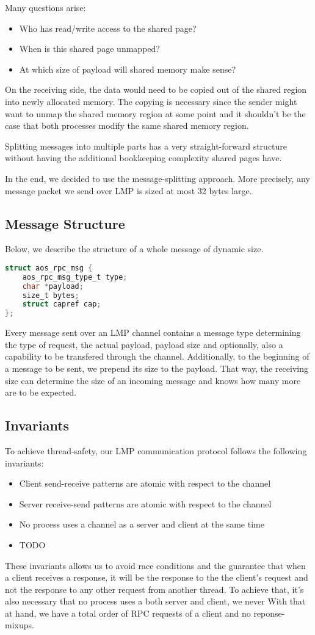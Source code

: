 Many questions arise:
\begin{itemize}
    \item Who has read/write access to the shared page? 
    \item When is this shared page unmapped?
    \item At which size of payload will shared memory make sense?
\end{itemize}
On the receiving side, the data would need to be copied out of the shared region 
into newly allocated memory. The copying is necessary since the sender 
might want to unmap the shared memory region at some point and it shouldn't be 
the case that both processes modify the same shared memory region.

Splitting messages into multiple parts has a very straight-forward structure 
without having the additional bookkeeping complexity shared pages have.


In the end, we decided to use the message-splitting approach.
More precisely, any message packet we send over LMP is sized at most 32 bytes
large.  

\subsection{Message Structure}
Below, we describe the structure of a whole message of dynamic size.
\begin{lstlisting}[language=C]
struct aos_rpc_msg {
    aos_rpc_msg_type_t type;
    char *payload;
    size_t bytes;
    struct capref cap;
};
\end{lstlisting}
Every message sent over an LMP channel contains a message type determining 
the type of request, the actual payload, payload size and optionally, 
also a capability to be transfered through the channel. 
Additionally, to the beginning of a message to be sent, we prepend its size 
to the payload. That way, the receiving size can determine the size of an 
incoming message and knows how many more are to be expected.

\subsection{Invariants}
To achieve thread-safety, our LMP communication protocol 
follows the following invariants:
\begin{itemize}
    \item Client send-receive patterns are atomic with respect to the channel
    \item Server receive-send patterns are atomic with respect to the channel
    \item No process uses a channel as a server and client at the same time
    \item TODO
\end{itemize}
These invariants allows us to avoid race conditions and the guarantee that 
when a client receives a response, it will be the response to the the client's
request and not the response to any other request from another thread.
To achieve that, it's also necessary that no process uses a both server and client, we never 
With that at hand, we have a total order of RPC requests of a client and no 
reponse-mixups.

